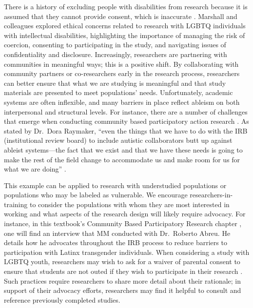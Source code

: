 \documentclass[
  11pt,
]{book}
\begin{document}
There is a history of excluding people with disabilities from research because it is assumed that they cannot provide consent, which is inaccurate \citep{marshall_navigating_2012}. Marshall and colleagues \citeyearpar{marshall_navigating_2012} explored ethical concerns related to research with LGBTQ individuals with intellectual disabilities, highlighting the importance of managing the risk of coercion, consenting to participating in the study, and navigating issues of confidentiality and disclosure. Increasingly, researchers are partnering with communities in meaningful ways; this is a positive shift. By collaborating with community partners or co-researchers early in the research process, researchers can better ensure that what we are studying is meaningful and that study materials are presented to meet populations' needs. Unfortunately, academic systems are often inflexible, and many barriers in place reflect ableism on both interpersonal and structural levels. For instance, there are a number of challenges that emerge when conducting community based participatory action research \citep[see][ for an overview]{mccracken_ethics_2020}. As stated by Dr.~Dora Raymaker, ``even the things that we have to do with the IRB (institutional review board) to include autistic collaborators butt up against ableist systems---the fact that we exist and that we have these needs is going to make the rest of the field change to accommodate us and make room for us for what we are doing'' \citep[p.~214]{dwyer_expert_2021}.

This example can be applied to research with understudied populations or populations who may be labeled as vulnerable. We encourage researchers-in-training to consider the populations with whom they are most interested in working and what aspects of the research design will likely require advocacy. For instance, in this textbook's Community Based Participatory Research chapter , one will find an interview that MM conducted with Dr.~Roberto Abreu. He details how he advocates throughout the IRB process to reduce barriers to participation with Latinx transgender individuals. When considering a study with LGBTQ youth, researchers may wish to ask for a waiver of parental consent to ensure that students are not outed if they wish to participate in their research \citep[see][]{flores_obtaining_2018}. Such practices require researchers to share more detail about their rationale; in support of their advocacy efforts, researchers may find it helpful to consult and reference previously completed studies.
\end{document}
